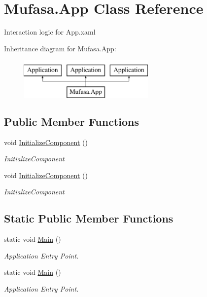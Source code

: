 \hypertarget{class_mufasa_1_1_app}{\section{Mufasa.\+App Class Reference}
\label{class_mufasa_1_1_app}
}


Interaction logic for App.\+xaml  


Inheritance diagram for Mufasa.\+App\+:\begin{figure}[H]
\begin{center}
\leavevmode
\includegraphics[height=2.000000cm]{class_mufasa_1_1_app}
\end{center}
\end{figure}
\subsection*{Public Member Functions}
\begin{DoxyCompactItemize}
\item 
void \hyperlink{class_mufasa_1_1_app_a435f5254a1c508dd14b74d26a21fcc56}{Initialize\+Component} ()
\begin{DoxyCompactList}\small\item\em Initialize\+Component \end{DoxyCompactList}\item 
void \hyperlink{class_mufasa_1_1_app_a435f5254a1c508dd14b74d26a21fcc56}{Initialize\+Component} ()
\begin{DoxyCompactList}\small\item\em Initialize\+Component \end{DoxyCompactList}\end{DoxyCompactItemize}
\subsection*{Static Public Member Functions}
\begin{DoxyCompactItemize}
\item 
static void \hyperlink{class_mufasa_1_1_app_a90c95039f45523ba0da98628e288ffff}{Main} ()
\begin{DoxyCompactList}\small\item\em Application Entry Point. \end{DoxyCompactList}\item 
static void \hyperlink{class_mufasa_1_1_app_a90c95039f45523ba0da98628e288ffff}{Main} ()
\begin{DoxyCompactList}\small\item\em Application Entry Point. \end{DoxyCompactList}\end{DoxyCompactItemize}


